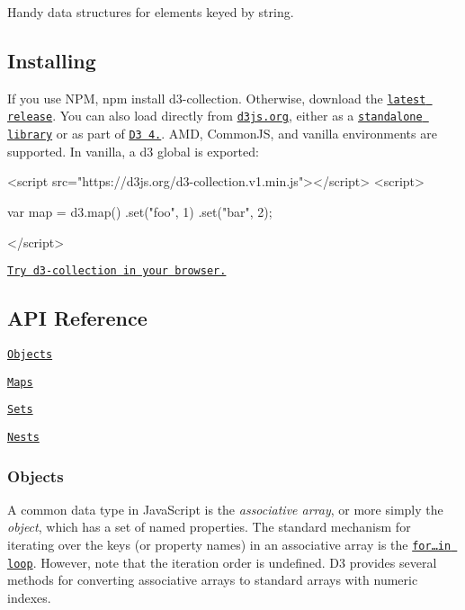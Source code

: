 Handy data structures for elements keyed by string.

\subsection*{Installing}

If you use N\+PM, {\ttfamily npm install d3-\/collection}. Otherwise, download the \href{https://github.com/d3/d3-collection/releases/latest}{\tt latest release}. You can also load directly from \href{https://d3js.org}{\tt d3js.\+org}, either as a \href{https://d3js.org/d3-collection.v1.min.js}{\tt standalone library} or as part of \href{https://github.com/d3/d3}{\tt D3 4.}. A\+MD, Common\+JS, and vanilla environments are supported. In vanilla, a {\ttfamily d3} global is exported\+:


\begin{DoxyCode}
<script src="https://d3js.org/d3-collection.v1.min.js"></script>
<script>

var map = d3.map()
    .set("foo", 1)
    .set("bar", 2);

</script>
\end{DoxyCode}


\href{https://tonicdev.com/npm/d3-collection}{\tt Try d3-\/collection in your browser.}

\subsection*{A\+PI Reference}


\begin{DoxyItemize}
\item \href{#objects}{\tt Objects}
\item \href{#maps}{\tt Maps}
\item \href{#sets}{\tt Sets}
\item \href{#nests}{\tt Nests}
\end{DoxyItemize}

\subsubsection*{Objects}

A common data type in Java\+Script is the {\itshape associative array}, or more simply the {\itshape object}, which has a set of named properties. The standard mechanism for iterating over the keys (or property names) in an associative array is the \href{https://developer.mozilla.org/en/JavaScript/Reference/Statements/for...in}{\tt for…in loop}. However, note that the iteration order is undefined. D3 provides several methods for converting associative arrays to standard arrays with numeric indexes.

